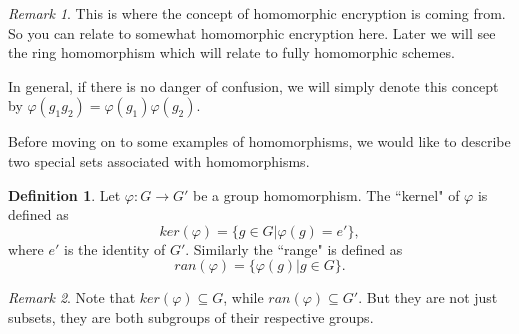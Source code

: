 \documentclass[12pt]{article}
\theoremstyle{plain}
\theoremstyle{definition}
\newtheorem{definition}{Definition}
\theoremstyle{remark}
\newtheorem{remark}{Remark}
\begin{document}
\begin{remark}
This is where the concept of homomorphic encryption is coming from. So you can relate to somewhat homomorphic encryption here. Later we will see the ring homomorphism which will relate to fully homomorphic schemes.
\end{remark}

In general, if there is no danger of confusion, we will simply denote this concept by
$\varphi(g_1g_2) = \varphi(g_1)\varphi(g_2)$.

Before moving on to some examples of homomorphisms, we would like to describe two special sets associated with homomorphisms.
\begin{definition}
Let $\varphi:G\rightarrow G'$ be a group homomorphism.
The ``kernel" of $\varphi$ is defined as
$$ker(\varphi) = \{g\in G|\varphi(g)=e'\},$$
where $e'$ is the identity of $G'$.
Similarly the ``range" is defined as
$$ran(\varphi) = \{\varphi(g)|g\in G\}.$$
\end{definition}
\begin{remark}
Note that $ker(\varphi) \subseteq G$, while $ran(\varphi) \subseteq G'$. But they are not just subsets, they are both subgroups of their respective groups.
\end{remark}
\end{document}
